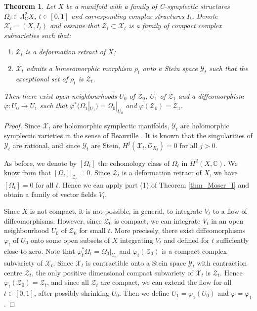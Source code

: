 \documentclass[10pt]{amsart}
\newcommand{\bbC}{\mathbb{C}}
\newcommand{\OO}{\mathcal{O}}
\newcommand{\XX}{\mathcal{X}}
\newcommand{\YY}{\mathcal{Y}}
\newcommand{\ZZ}{\mathcal{Z}}
\newtheorem{thm}[defn]{Theorem}
\begin{document}
\begin{thm}\label{thm_contr}
Let $X$ be a manifold with a family of C-symplectic structures $\Omega_t\in \Lambda^2_\bbC X$,
$t\in [0,1]$ and corresponding complex structures $I_t$. Denote $\XX_t = (X,I_t)$ and
assume that $\ZZ_t\subset \XX_t$ is a family of compact complex subvarieties such that:
\begin{enumerate}
\item $\ZZ_t$ is a deformation retract of $X$;
\item $\XX_t$ admits a bimeromorphic morphism $\rho_t$ onto a Stein space $\YY_t$ such that
the exceptional set of $\rho_t$ is $\ZZ_t$.
\end{enumerate}
Then there exist open neighbourhoods $U_0$ of $\ZZ_0$, $U_1$ of $\ZZ_1$ and a diffeomorphism
$\varphi\colon U_0 \to U_1$ such that $\varphi^*(\Omega_1|_{U_1}) = \Omega_0|_{U_0}$ and $\varphi(\ZZ_0) = \ZZ_1$.
\end{thm}
\begin{proof}
Since $\XX_t$ are holomorphic symplectic manifolds, $\YY_t$ are holomorphic symplectic
varieties in the sense of Beauville \cite{Be}. It is known \cite[Proposition 1.3]{Be} that the singularities
of $\YY_t$ are rational, and since $\YY_t$ are Stein, $H^j(\XX_t,\OO_{X_t}) = 0$ for all $j>0$.

As before, we denote by $[\Omega_t]$ the cohomology class of $\Omega_t$ in $H^2(X,\bbC)$.
We know from \cite[Corollary 2.8]{Ka} that $[\Omega_t]|_{\ZZ_t} = 0$. Since $\ZZ_t$ is a deformation
retract of $X$, we have $[\Omega_t] = 0$ for all $t$. Hence we can apply part (1) of Theorem \ref{thm_Moser_I}
and obtain a family of vector fields $V_t$.

Since $X$ is not compact, it is not possible, in general, to integrate $V_t$ to a flow of
diffeomorphisms. However, since $\ZZ_0$ is compact, we can integrate $V_t$ in an open
neighbourhood $U_0$ of $\ZZ_0$ for small $t$. More precisely, there exist diffeomorphisms
$\varphi_t$ of $U_0$ onto some open subsets of $X$ integrating $V_t$ and defined for
$t$ sufficiently close to zero. Note that $\varphi_t^*\Omega_t = \Omega_0|_{U_0}$ and
$\varphi_t(\ZZ_0)$ is a compact complex subvariety of $\XX_t$. Since $\XX_t$ is contractible
onto a Stein space $\YY_t$ with contraction centre $\ZZ_t$, the only positive dimensional
compact subvariety of $\XX_t$ is $\ZZ_t$. Hence $\varphi_t(\ZZ_0) = \ZZ_t$, and since all $\ZZ_t$ are compact,
we can extend the flow for all $t\in [0,1]$, after possibly shrinking $U_0$. Then
we define $U_1 = \varphi_1(U_0)$ and $\varphi = \varphi_1$.
\end{proof}
\end{document}
